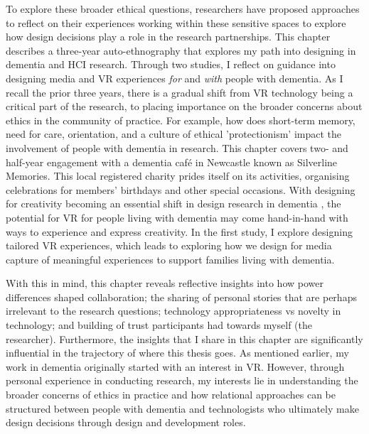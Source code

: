 To explore these broader ethical questions, researchers have proposed approaches to reflect on their experiences working within these sensitive spaces to explore how design decisions play a role in the research partnerships. This chapter describes a three-year auto-ethnography that explores my path into designing in dementia and HCI research. Through two studies, I reflect on guidance into designing media and VR experiences \textit{for} and \textit{with} people with dementia. As I recall the prior three years, there is a gradual shift from VR technology being a critical part of the research, to placing importance on the broader concerns about ethics in the community of practice. For example, how does short-term memory, need for care, orientation, and a culture of ethical 'protectionism' impact the involvement of people with dementia in research. This chapter covers two- and half-year engagement with a dementia café in Newcastle known as Silverline Memories. This local registered charity prides itself on its activities, organising celebrations for members' birthdays and other special occasions. With designing for creativity becoming an essential shift in design research in dementia \citep{john_killick_claire_craig_creativity_2012,morrissey_creative_2015,wallace_design-led_2013}, the potential for VR for people living with dementia may come hand-in-hand with ways to experience and express creativity. In the first study, I explore designing tailored VR experiences, which leads to exploring how we design for media capture of meaningful experiences to support families living with dementia.

With this in mind, this chapter reveals reflective insights into how power differences shaped collaboration; the sharing of personal stories that are perhaps irrelevant to the research questions; technology appropriateness vs novelty in technology; and building of trust participants had towards myself (the researcher). Furthermore, the insights that I share in this chapter are significantly influential in the trajectory of where this thesis goes. As mentioned earlier, my work in dementia originally started with an interest in VR. However, through personal experience in conducting research, my interests lie in understanding the broader concerns of ethics in practice and how relational approaches can be structured between people with dementia and technologists who ultimately make design decisions through design and development roles.


